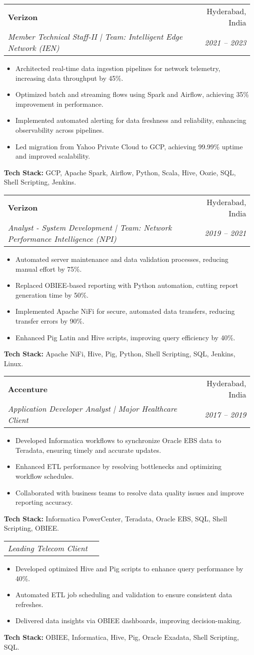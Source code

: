 \documentclass[letterpaper,11pt]{article}
\makeatletter
\newcommand{\resumeSubheading}[4]{
  \vspace{-1pt}\item
    \begin{tabular*}{0.97\textwidth}[t]{l@{\extracolsep{\fill}}r}
      \textbf{#1} & #2 \\
      \textit{\small#3} & \textit{\small#4} \\
    \end{tabular*}\vspace{-5pt}
}
\newcommand{\resumeSubSubheading}[2]{
    \begin{tabular*}{0.97\textwidth}{l@{\extracolsep{\fill}}r}
      \textit{\small#1} & \textit{\small#2} \\
    \end{tabular*}\vspace{-5pt}
}
\newcommand{\resumeItemListStart}{\begin{itemize}}
\newcommand{\resumeItemListEnd}{\end{itemize}\vspace{-5pt}}
\makeatother
\begin{document}
\resumeSubheading
{Verizon}{Hyderabad, India}
{Member Technical Staff-II | Team: Intelligent Edge Network (IEN)}{2021 -- 2023}
\resumeItemListStart
\item Architected real-time data ingestion pipelines for network telemetry, increasing data throughput by 45\%.
\item Optimized batch and streaming flows using Spark and Airflow, achieving 35\% improvement in performance.
\item Implemented automated alerting for data freshness and reliability, enhancing observability across pipelines.
\item Led migration from Yahoo Private Cloud to GCP, achieving 99.99\% uptime and improved scalability.
\resumeItemListEnd
\textbf{Tech Stack:} GCP, Apache Spark, Airflow, Python, Scala, Hive, Oozie, SQL, Shell Scripting, Jenkins.

\resumeSubheading
{Verizon}{Hyderabad, India}
{Analyst - System Development | Team: Network Performance Intelligence (NPI)}{2019 -- 2021}
\resumeItemListStart
\item Automated server maintenance and data validation processes, reducing manual effort by 75\%.
\item Replaced OBIEE-based reporting with Python automation, cutting report generation time by 50\%.
\item Implemented Apache NiFi for secure, automated data transfers, reducing transfer errors by 90\%.
\item Enhanced Pig Latin and Hive scripts, improving query efficiency by 40\%.
\resumeItemListEnd
\textbf{Tech Stack:} Apache NiFi, Hive, Pig, Python, Shell Scripting, SQL, Jenkins, Linux.

\resumeSubheading
{Accenture}{Hyderabad, India}
{Application Developer Analyst | Major Healthcare Client}{2017 -- 2019}
\resumeItemListStart
\item Developed Informatica workflows to synchronize Oracle EBS data to Teradata, ensuring timely and accurate updates.
\item Enhanced ETL performance by resolving bottlenecks and optimizing workflow schedules.
\item Collaborated with business teams to resolve data quality issues and improve reporting accuracy.
\resumeItemListEnd
\textbf{Tech Stack:} Informatica PowerCenter, Teradata, Oracle EBS, SQL, Shell Scripting, OBIEE.

\resumeSubSubheading{Leading Telecom Client}{}
\resumeItemListStart
\item Developed optimized Hive and Pig scripts to enhance query performance by 40\%.
\item Automated ETL job scheduling and validation to ensure consistent data refreshes.
\item Delivered data insights via OBIEE dashboards, improving decision-making.
\resumeItemListEnd
\textbf{Tech Stack:} OBIEE, Informatica, Hive, Pig, Oracle Exadata, Shell Scripting, SQL.
\end{document}
